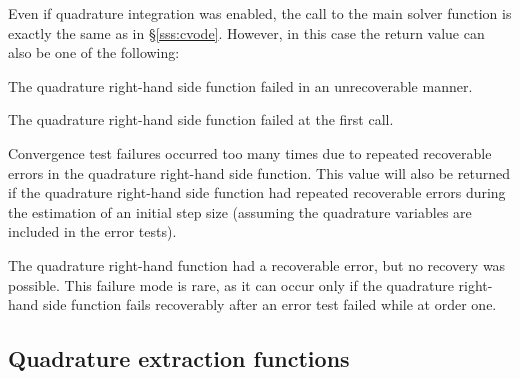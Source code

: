 Even if quadrature integration was enabled, the call to the main solver
function  is exactly the same as in \S\ref{sss:cvode}. However, in this
case the return value  can also be one of the following:
\begin{args}
\item[\Id{CV\_QRHSFUNC\_FAIL}]
  The quadrature right-hand side function failed in an unrecoverable manner.
\item[\Id{CV\_FIRST\_QRHSFUNC\_FAIL}]
  The quadrature right-hand side function failed at the first call.
\item[\Id{CV\_REPTD\_QRHSFUNC\_ERR}]
  Convergence test failures occurred too many times due to repeated recoverable errors in
  the quadrature right-hand side function. This value will also
  be returned if the quadrature right-hand side function had repeated recoverable errors
  during the estimation of an initial step size (assuming the quadrature
  variables are included in the error tests).
\item[\Id{CV\_UNREC\_RHSFUNC\_ERR}]
  The quadrature right-hand function had a recoverable error, but no recovery was possible.
  This failure mode is rare, as it can occur only if the quadrature right-hand side function
  fails recoverably after an error test failed while at order one.
\end{args}


\subsection{Quadrature extraction functions}\label{ss:quad_get}

